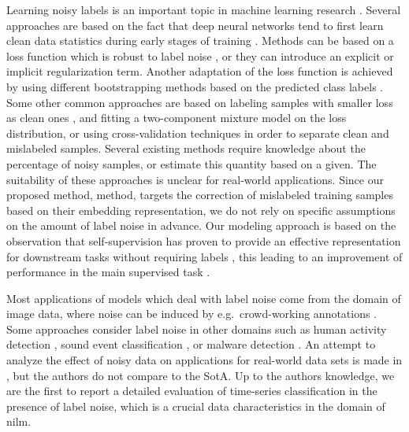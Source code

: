 \documentclass[runningheads, envcountsame, a4paper]{llncs}
\begin{document}
Learning noisy labels is an important topic in machine learning research  \cite{song2020learning,han2020survey}.
Several approaches are based on the fact that deep neural networks tend to first learn clean data statistics during early stages of training  \cite{rolnick2017deep,zhang2016understanding,arpit2017closer}.
Methods can be based on a loss function which is robust to label noise \cite{zhang2018generalized,van2015learning}, or they can introduce an explicit \cite{berthelot2019mixmatch} or implicit \cite{reed2015training} regularization term.
Another adaptation of the loss function is achieved by using different bootstrapping methods based on the predicted class labels \cite{han2020survey,nguyen2019self,wang2020self}.
Some other common approaches are based on labeling samples with smaller loss as clean ones \cite{arazo2019unsupervised,han2020sigua,jiang2018mentornet,li2020dividemix}, and fitting a two-component mixture model on the loss distribution, or using cross-validation techniques \cite{chen2019understanding} in order to separate clean and mislabeled samples.
Several existing methods \cite{sugiyama2018co,mandal2020novel,han2020sigua} require knowledge about the percentage of noisy samples, or estimate this quantity based on  a given. The suitability of these approaches is unclear for real-world applications.
Since our proposed method, \acrshort{method}, targets the correction of mislabeled training samples based on their embedding representation, we do not rely on specific  assumptions on the  amount of label noise in advance.
Our modeling approach is based on the observation that self-supervision 
has proven to provide an effective representation for downstream tasks without requiring labels \cite{hendrycks2019using,huang2021self}, this leading to an improvement of performance in the main supervised task \cite{jawed2020self}.

Most applications of models which deal with label noise come from the domain of image data, where noise can be induced by e.g.\ crowd-working annotations  \cite{Karimi2020DeepLW,han2020survey}. Some approaches consider label noise in other domains such as human activity detection \cite{atkinson2020identifying}, sound event classification \cite{fonseca2019learning}, or malware detection \cite{Gavrilut2011DealingWC}.
An attempt to analyze the effect of noisy data on applications for real-world data sets is made in \cite{Wang2019ALN}, but the authors do not compare to the SotA.
Up to the authors knowledge, we are the first to report a detailed evaluation of time-series classification in the presence of label noise, which is a crucial data characteristics in the domain of \acrshort{nilm}.
\end{document}
